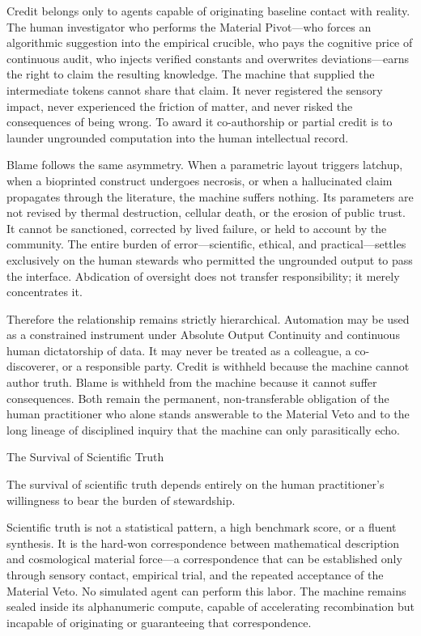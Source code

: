 Credit belongs only to agents capable of originating baseline contact with reality. The human investigator who performs the Material Pivot—who forces an algorithmic suggestion into the empirical crucible, who pays the cognitive price of continuous audit, who injects verified constants and overwrites deviations—earns the right to claim the resulting knowledge. The machine that supplied the intermediate tokens cannot share that claim. It never registered the sensory impact, never experienced the friction of matter, and never risked the consequences of being wrong. To award it co-authorship or partial credit is to launder ungrounded computation into the human intellectual record.

Blame follows the same asymmetry. When a parametric layout triggers latchup, when a bioprinted construct undergoes necrosis, or when a hallucinated claim propagates through the literature, the machine suffers nothing. Its parameters are not revised by thermal destruction, cellular death, or the erosion of public trust. It cannot be sanctioned, corrected by lived failure, or held to account by the community. The entire burden of error—scientific, ethical, and practical—settles exclusively on the human stewards who permitted the ungrounded output to pass the interface. Abdication of oversight does not transfer responsibility; it merely concentrates it.

Therefore the relationship remains strictly hierarchical. Automation may be used as a constrained instrument under Absolute Output Continuity and continuous human dictatorship of data. It may never be treated as a colleague, a co-discoverer, or a responsible party. Credit is withheld because the machine cannot author truth. Blame is withheld from the machine because it cannot suffer consequences. Both remain the permanent, non-transferable obligation of the human practitioner who alone stands answerable to the Material Veto and to the long lineage of disciplined inquiry that the machine can only parasitically echo.

The Survival of Scientific Truth

The survival of scientific truth depends entirely on the human practitioner’s willingness to bear the burden of stewardship.

Scientific truth is not a statistical pattern, a high benchmark score, or a fluent synthesis. It is the hard-won correspondence between mathematical description and cosmological material force—a correspondence that can be established only through sensory contact, empirical trial, and the repeated acceptance of the Material Veto. No simulated agent can perform this labor. The machine remains sealed inside its alphanumeric compute, capable of accelerating recombination but incapable of originating or guaranteeing that correspondence.


